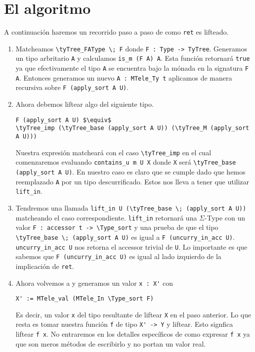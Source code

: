 \section{El algoritmo}

A continuación haremos un recorrido paso a paso de como \lstinline{ret} es lifteado.

\begin{enumerate}
    \item Matcheamos \lstinline{\tyTree_FAType \; F} donde \lstinline{F : Type -> TyTree}. Generamos un tipo arbritario \lstinline{A} y calculamos \lstinline{is_m (F A) A}. Esta función retornará \lstinline{true} ya que efectivamente el tipo \lstinline{A} se encuentra bajo la mónada en la signatura \lstinline{F A}. Entonces generamos un nuevo \lstinline{A : MTele_Ty t} aplicamos \lift de manera recursiva sobre \lstinline{F (apply_sort A U)}.
    \item Ahora debemos liftear algo del siguiente tipo.
    \begin{lstlisting}
F (apply_sort A U) $\equiv$
\tyTree_imp (\tyTree_base (apply_sort A U)) (\tyTree_M (apply_sort A U)))
    \end{lstlisting}
    Nuestra expresión matcheará con el caso \lstinline{\tyTree_imp} en el cual comenzaremos evaluando \lstinline{contains_u m U X} donde \lstinline{X} será \lstinline{\tyTree_base (apply_sort A U)}. En nuestro caso es claro que se cumple dado que hemos reemplazado \lstinline{A} por un tipo descurrificado. Estos nos lleva a tener que utilizar \lstinline{lift_in}.
    \item Tendremos una llamada \lstinline{lift_in U (\tyTree_base \; (apply_sort A U))} matcheando el caso correspondiente.
    \lstinline{lift_in} retornará una $\Sigma$-Type con un valor \lstinline{F : accessor t -> \Type_sort} y una prueba de que el tipo \lstinline{\tyTree_base \; (apply_sort A U)} es igual a \lstinline{F (uncurry_in_acc U)}. \lstinline{uncurry_in_acc U} nos retorna el accessor trivial de \lstinline{U}. Lo importante es que sabemos que \lstinline{F (uncurry_in_acc U)} es igual al lado izquierdo de la implicación de \lstinline{ret}.
    \item Ahora volvemos a \lift y generamos un valor \lstinline{x : X'} con
    \begin{lstlisting}
X' := MTele_val (MTele_In \Type_sort F)
    \end{lstlisting}
    Es decir, un valor \lstinline{x} del tipo resultante de liftear \lstinline{X} en el paso anterior. Lo que resta es tomar nuestra función \lstinline{f} de tipo \lstinline{X' -> Y} y liftear. Esto signfica liftear \lstinline{f x}. No entraremos en los detalles específicos de como expresar \lstinline{f x} ya que son meros métodos de escribirlo y no portan un valor real.

\end{enumerate}

